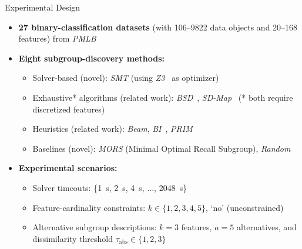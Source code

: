 \documentclass[en, navbaroff]{sdqbeamer}
\begin{document}
\begin{frame}[t]{Experimental Design}
	\begin{itemize}
		\item \textbf{27 binary-classification datasets} (with 106--9822 data objects and 20--168 features) from \emph{PMLB}~\cite{olson2017pmlb, romano2021pmlb}
		\pause
		\vspace{\baselineskip}
		\item \textbf{Eight subgroup-discovery methods:}
		\begin{itemize}
			\item Solver-based (novel): \emph{SMT} (using \emph{Z3}~\cite{bjorner2015nuz, deMoura2008z3} as optimizer)
			\item Exhaustive* algorithms (related work): \emph{BSD}~\cite{lemmerich2010fast}, \emph{SD-Map}~\cite{atzmueller2006sd} (* both require discretized features)
			\item Heuristics (related work): \emph{Beam}, \emph{BI}~\cite{mampaey2012efficient}, \emph{PRIM}~\cite{friedman1999bump}
			\item Baselines (novel): \emph{MORS} (Minimal Optimal Recall Subgroup), \emph{Random}
		\end{itemize}
		\pause
		\vspace{\baselineskip}
		\item \textbf{Experimental scenarios:}
		\begin{itemize}
			\item Solver timeouts: \{1~s, 2~s, 4~s, $\dots$, 2048~s\}
			\item Feature-cardinality constraints: $k \in \{1, 2, 3, 4, 5\}$, `no' (unconstrained)
			\item Alternative subgroup descriptions: $k=3$ features, $a=5$ alternatives, and dissimilarity threshold $\tau_{\text{abs}} \in \{1, 2, 3\}$

\end{itemize}
\end{itemize}
\end{frame}
\end{document}
